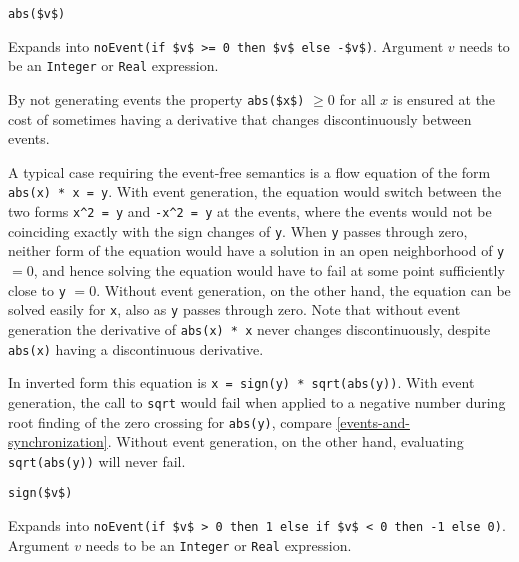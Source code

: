 \begin{functiondefinition}[abs]
\begin{synopsis}\begin{lstlisting}
abs($v$)
\end{lstlisting}\end{synopsis}
\begin{semantics}
Expands into \lstinline!noEvent(if $v$ >= 0 then $v$ else -$v$)!.
Argument $v$ needs to be an \lstinline!Integer! or \lstinline!Real! expression.
\end{semantics}
\begin{nonnormative}
By not generating events the property \lstinline!abs($x$)! $\geq 0$ for all $x$ is ensured at the cost of sometimes having a derivative that changes discontinuously between events.

A typical case requiring the event-free semantics is a flow equation of the form \lstinline!abs(x) * x = y!.
With event generation, the equation would switch between the two forms \lstinline!x^2 = y! and \lstinline!-x^2 = y! at the events, where the events would not be coinciding exactly with the sign changes of \lstinline!y!.
When \lstinline!y! passes through zero, neither form of the equation would have a solution in an open neighborhood of \lstinline!y! $= 0$, and hence solving the equation would have to fail at some point sufficiently close to \lstinline!y! $= 0$.
Without event generation, on the other hand, the equation can be solved easily for \lstinline!x!, also as \lstinline!y! passes through zero.
Note that without event generation the derivative of \lstinline!abs(x) * x! never changes discontinuously, despite \lstinline!abs(x)! having a discontinuous derivative.

In inverted form this equation is \lstinline!x = sign(y) * sqrt(abs(y))!.
With event generation, the call to \lstinline!sqrt! would fail when applied to a negative number during root finding of the zero crossing for \lstinline!abs(y)!, compare \cref{events-and-synchronization}.
Without event generation, on the other hand, evaluating \lstinline!sqrt(abs(y))! will never fail.
\end{nonnormative}
\end{functiondefinition}

\begin{functiondefinition}[sign]
\begin{synopsis}\begin{lstlisting}
sign($v$)
\end{lstlisting}\end{synopsis}
\begin{semantics}
Expands into \lstinline!noEvent(if $v$ > 0 then 1 else if $v$ < 0 then -1 else 0)!.
Argument $v$ needs to be an \lstinline!Integer! or \lstinline!Real! expression.
\end{semantics}
\end{functiondefinition}

